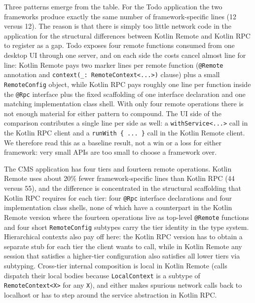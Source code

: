 \documentclass[a4paper,11pt,oneside]{article}
\newcommand{\kotlini}[1]{\texttt{#1}}
\begin{document}
Three patterns emerge from the table. For the Todo application the two frameworks
produce exactly the same number of framework-specific lines (12 versus 12). The reason
is that there is simply too little network code in the application for the structural
differences between Kotlin Remote and Kotlin RPC to register as a gap. Todo exposes
four remote functions consumed from one desktop UI through one server, and on each side
the costs cancel almost line for line: Kotlin Remote pays two marker lines per remote
function (\kotlini{@Remote} annotation and \kotlini{context(_: RemoteContext<...>)}
clause) plus a small \kotlini{RemoteConfig} object, while Kotlin RPC pays roughly one
line per function inside the \kotlini{@Rpc} interface plus the fixed scaffolding of one
interface declaration and one matching implementation class shell. With only four remote
operations there is not enough material for either pattern to compound. The UI side of
the comparison contributes a single line per side as well: a \kotlini{withService<...>}
call in the Kotlin RPC client and a \kotlini{runWith \{ ... \}} call in the Kotlin Remote
client. We therefore read this as a baseline result, not a win or a loss for either
framework: very small APIs are too small to choose a framework over.

The CMS application has four tiers and fourteen remote operations. Kotlin Remote uses
about 20\% fewer framework-specific lines than Kotlin RPC (44 versus 55), and the
difference is concentrated in the structural scaffolding that Kotlin RPC requires for
each tier: four \kotlini{@Rpc} interface declarations and four implementation class
shells, none of which have a counterpart in the Kotlin Remote version where the fourteen
operations live as top-level \kotlini{@Remote} functions and four short
\kotlini{RemoteConfig} subtypes carry the tier identity in the type system. Hierarchical
contexts also pay off here: the Kotlin RPC version has to obtain a separate stub for
each tier the client wants to call, while in Kotlin Remote any session that satisfies a
higher-tier configuration also satisfies all lower tiers via subtyping. Cross-tier
internal composition is local in Kotlin Remote (calls dispatch their local bodies because
\kotlini{LocalContext} is a subtype of \kotlini{RemoteContext<X>} for any \kotlini{X}),
and either makes spurious network calls back to localhost or has to step around the
service abstraction in Kotlin RPC.
\end{document}
